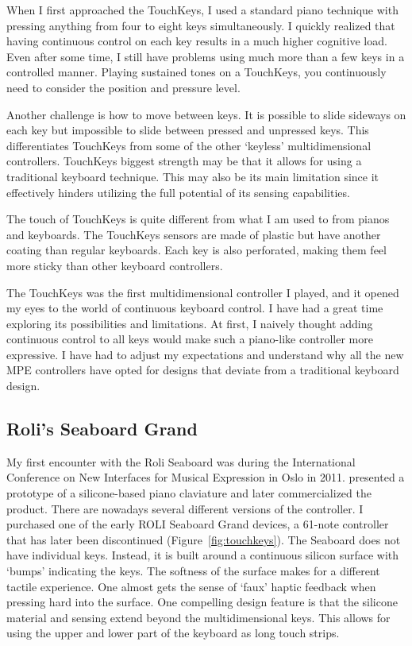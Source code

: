 When I first approached the TouchKeys, I used a standard piano technique with pressing anything from four to eight keys simultaneously. I quickly realized that having continuous control on each key results in a much higher cognitive load. Even after some time, I still have problems using much more than a few keys in a controlled manner. Playing sustained tones on a TouchKeys, you continuously need to consider the position and pressure level.

Another challenge is how to move between keys. It is possible to slide sideways on each key but impossible to slide between pressed and unpressed keys. This differentiates TouchKeys from some of the other `keyless' multidimensional controllers. TouchKeys biggest strength may be that it allows for using a traditional keyboard technique. This may also be its main limitation since it effectively hinders utilizing the full potential of its sensing capabilities.

The touch of TouchKeys is quite different from what I am used to from pianos and keyboards. The TouchKeys sensors are made of plastic but have another coating than regular keyboards. Each key is also perforated, making them feel more sticky than other keyboard controllers.

The TouchKeys was the first multidimensional controller I played, and it opened my eyes to the world of continuous keyboard control. I have had a great time exploring its possibilities and limitations. At first, I naively thought adding continuous control to all keys would make such a piano-like controller more expressive. I have had to adjust my expectations and understand why all the new MPE controllers have opted for designs that deviate from a traditional keyboard design.


\subsection{Roli's Seaboard Grand}\label{sec:seaboard}

My first encounter with the Roli Seaboard was during the International Conference on New Interfaces for Musical Expression in Oslo in 2011. \citet{lamb_seaboard_2011} presented a prototype of a silicone-based piano claviature and later commercialized the product. There are nowadays several different versions of the controller. I purchased one of the early ROLI Seaboard Grand devices, a 61-note controller that has later been discontinued (Figure~\ref{fig:touchkeys}).
The Seaboard does not have individual keys. Instead, it is built around a continuous silicon surface with `bumps' indicating the keys. The softness of the surface makes for a different tactile experience. One almost gets the sense of `faux' haptic feedback when pressing hard into the surface. One compelling design feature is that the silicone material and sensing extend beyond the multidimensional keys. This allows for using the upper and lower part of the keyboard as long touch strips.

